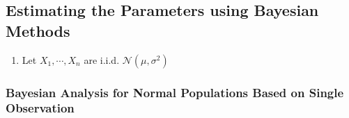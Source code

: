 \subsection{Estimating the Parameters using Bayesian Methods}

\begin{enumerate}
    \item Let $X_1, \cdots, X _n$ are i.i.d. $\mathcal{N} (\mu, \sigma^2)$
    \hfill \cite{statistics/book/Statistics-for-Data-Scientists/Maurits-Kaptein}

\end{enumerate}

\subsubsection{Bayesian Analysis for Normal Populations Based on Single Observation}

